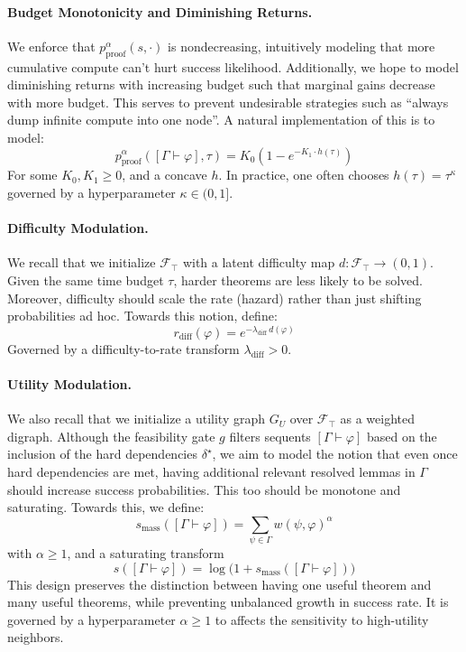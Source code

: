 \documentclass[letterpaper]{article} %
\renewcommand{\phi}{\varphi}
\newcommand{\proves}{\vdash}
\begin{document}
\paragraph{Budget Monotonicity and Diminishing Returns.} We enforce that $p^\alpha_{\mathrm{proof}}(s,\cdot)$ is nondecreasing, intuitively modeling that more cumulative compute can’t hurt success likelihood. Additionally, we hope to model diminishing returns with increasing budget such that marginal gains decrease with more budget. This serves to prevent undesirable strategies such as ``always dump infinite compute into one node''. A natural implementation of this is to model:
\[
p_{\text{proof}}^\alpha([\Gamma \proves \phi],\tau)=K_0\left(1-e^{-K_1\cdot h(\tau)}\right)
\]
For some $K_0,K_1\ge 0$, and a concave $h$. In practice, one often chooses $h(\tau) = \tau^\kappa$ governed by a hyperparameter $\kappa \in (0,1]$.

\paragraph{Difficulty Modulation.} We recall that we initialize $\mathcal{F}_\top$ with a latent difficulty map $d: \mathcal{F}_\top \to (0,1)$. Given the same time budget $\tau$, harder theorems are less likely to be solved. Moreover, difficulty should scale the rate (hazard) rather than just shifting probabilities ad hoc. Towards this notion, define:
\[
r_{\mathrm{diff}}(\phi)=e^{-\lambda_{\mathrm{diff}}\,d(\phi)}
\]
Governed by a difficulty-to-rate transform $\lambda_{\mathrm{diff}}>0$.

\paragraph{Utility Modulation.} We also recall that we initialize a utility graph $G_U$ over $\mathcal{F}_\top$ as a weighted digraph. Although the feasibility gate $g$ filters sequents $[\Gamma \proves \phi]$ based on the inclusion of the hard dependencies $\delta^\star$, we aim to model the notion that even once hard dependencies are met, having additional relevant resolved lemmas in $\Gamma$ should increase success probabilities. This too should be monotone and saturating. Towards this, we define:
\[
s_{\text{mass}}([\Gamma \proves \phi])=\sum_{\psi\in \Gamma} w(\psi,\phi)^\alpha
\]
with $\alpha\ge 1$, and a saturating transform
\[
s([\Gamma \proves \phi])=\log\big(1+s_{\text{mass}}([\Gamma \proves \phi])\big)
\]
This design preserves the distinction between having one useful theorem and many useful theorems, while preventing unbalanced growth in success rate. It is governed by a hyperparameter $\alpha \ge 1$ to affects the sensitivity to high-utility neighbors.
\end{document}
